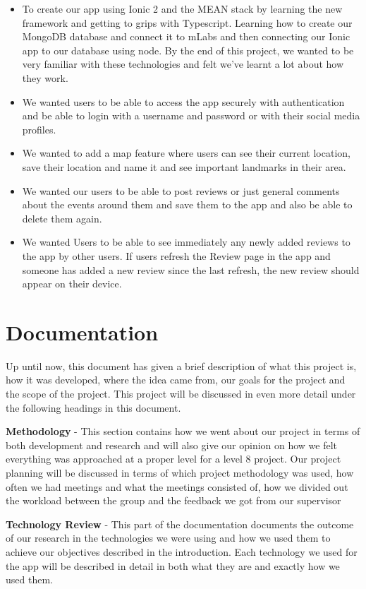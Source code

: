 \begin{itemize}
\item To create our app using Ionic 2 and the MEAN stack by learning the new framework and getting to grips with Typescript. Learning how to create our MongoDB database and connect it to mLabs and then connecting our Ionic app to our database using node. By the end of this project, we wanted to be very familiar with these technologies and felt we’ve learnt a lot about how they work.
\item We wanted users to be able to access the app securely with authentication and be able to login with a username and password or with their social media profiles.
\item We wanted to add a map feature where users can see their current location, save their location and name it and see important landmarks in their area.
\item We wanted our users to be able to post reviews or just general comments about the events around them and save them to the app and also be able to delete them again.
\item We wanted Users to be able to see immediately any newly added reviews to the app by other users. If users refresh the Review page in the app and someone has added a new review since the last refresh, the new review should appear on their device.  
\end{itemize}
\section{Documentation}
Up until now, this document has given a brief description of what this project is, how it was developed, where the idea came from, our goals for the project and the scope of the project. This project will be discussed in even more detail under the following headings in this document.

\textbf {Methodology} - This section contains how we went about our project in terms of both development and research and will also give our opinion on how we felt everything was approached at a proper level for a level 8 project. Our project planning will be discussed in terms of which project methodology was used, how often we had meetings and what the meetings consisted of, how we divided out the workload between the group and the feedback we got from our supervisor

\textbf {Technology Review} - This part of the documentation documents the outcome of our research in the technologies we were using and how we used them to achieve our objectives described in the introduction. Each technology we used for the app will be described in detail in both what they are and exactly how we used them.

